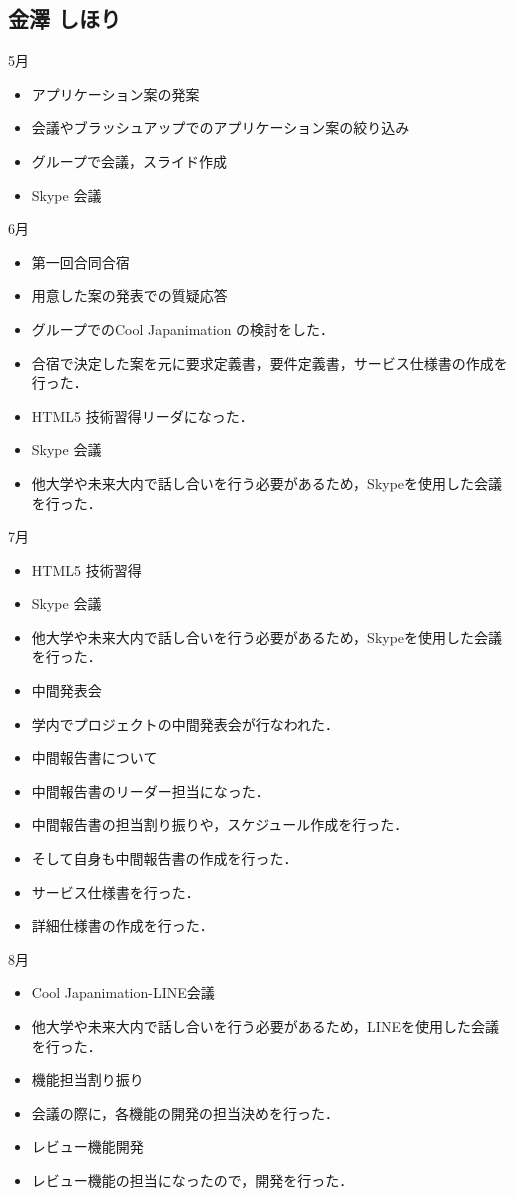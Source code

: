 \subsection{金澤 しほり}
5月
\begin{itemize}
\item アプリケーション案の発案
\item 会議やブラッシュアップでのアプリケーション案の絞り込み
\item グループで会議，スライド作成
\item Skype 会議
\end{itemize}
6月
\begin{itemize}
\item 第一回合同合宿
\item 用意した案の発表での質疑応答
\item グループでのCool Japanimation の検討をした．
\item 合宿で決定した案を元に要求定義書，要件定義書，サービス仕様書の作成を行った．
\item HTML5 技術習得リーダになった．
\item Skype 会議
\item   他大学や未来大内で話し合いを行う必要があるため，Skypeを使用した会議を行った．
\end{itemize}
7月
\begin{itemize}
\item HTML5 技術習得
\item Skype 会議
\item 他大学や未来大内で話し合いを行う必要があるため，Skypeを使用した会議を行った．
\item 中間発表会
\item 学内でプロジェクトの中間発表会が行なわれた．
\item 中間報告書について
\item   中間報告書のリーダー担当になった．
\item   中間報告書の担当割り振りや，スケジュール作成を行った．
\item   そして自身も中間報告書の作成を行った．
\item サービス仕様書を行った．
\item 詳細仕様書の作成を行った．
\end{itemize}
8月
\begin{itemize}
\item Cool Japanimation-LINE会議
\item   他大学や未来大内で話し合いを行う必要があるため，LINEを使用した会議を行った．
\item 機能担当割り振り
\item 会議の際に，各機能の開発の担当決めを行った．
\item レビュー機能開発
\item   レビュー機能の担当になったので，開発を行った．
\end{itemize}
